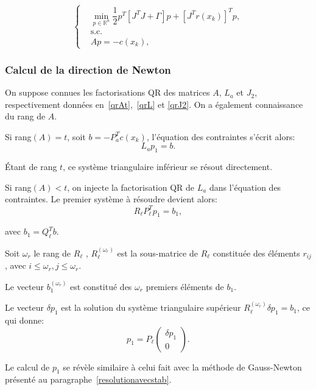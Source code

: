 \begin{equation} \label{pb newton}
 \left\{ \begin{aligned} &\underset{p \in \mathbb{R}^n}{\min} \dfrac{1}{2} p^T\left[J^TJ + \Gamma \right]p + \left[J^Tr(x_{k})\right]^Tp, \\ 
&\text{s.c.}\\
&Ap = -c(x_{k}),
\end{aligned} \right.
\end{equation}

\subsubsection{Calcul de la direction de Newton}

On suppose connues les factorisations QR des matrices $A$, $L_{a}$ et $J_{2}$, respectivement données en~\eqref{qrAt},~\eqref{qrL} et \eqref{qrJ2}. 
On a également connaissance du rang de $A$.

Si rang$(A)=t$, soit $b = -P_a^Tc(x_{k})$, l'équation des contraintes s'écrit alors: $$L_{a}p_1 = b.$$ 

\'Etant de rang $t$, ce système triangulaire inférieur se résout directement.

Si rang$(A)<t$, on injecte la factorisation QR de $L_{a}$ dans l'équation des contraintes. Le premier système à résoudre devient alors:
 \[ R_{\ell}P_{\ell}^Tp_1 = b_1,\]
 
avec $b_{1}=Q_{\ell}^{T}b$. 

Soit $\omega_{r}$  le rang de $R_{\ell}$ , $R_{\ell}^{(\omega_{r})}$ est la sous-matrice de $R_{\ell}$ constituée des éléments $r_{ij}$, avec $i \leq \omega_{r},j \leq \omega_r$. 

Le vecteur $b_{1}^{(\omega_{r})}$  est constitué des $\omega_{r}$ premiers éléments de $b_{1}$.

Le vecteur $\delta p_{1}$ est la solution du système triangulaire supérieur $R_{\ell}^{(\omega_{r})}\delta p_{1} = b_{1}$, ce qui donne:
\[ p_{1} = P_{\ell} \begin{pmatrix} \delta p_{1} \\ 0 \end{pmatrix}.\]

Le calcul de $p_1$ se révèle similaire à celui fait avec la méthode de Gauss-Newton présenté au paragraphe~\ref{resolutionavecstab}.

